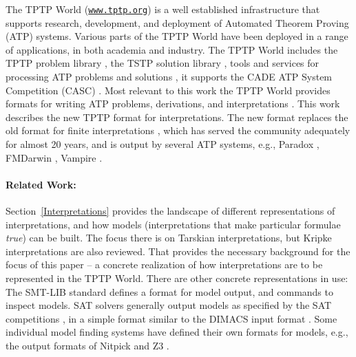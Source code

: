 \documentclass{easychair}
\begin{document}
The TPTP World \cite{Sut17} (\href{https://www.tptp.org}{\tt www.tptp.org}) is a well established 
infrastructure that supports research, development, and deployment of Automated Theorem Proving 
(ATP) systems.
Various parts of the TPTP World have been deployed in a range of applications,
in both academia and industry.
The TPTP World includes the TPTP problem library \cite{Sut09}, 
the TSTP solution library \cite{Sut10}, 
tools and services for processing ATP problems and solutions \cite{Sut10}, 
it supports the CADE ATP System Competition (CASC) \cite{Sut16}.
Most relevant to this work the TPTP World provides formats for writing ATP problems, 
derivations, and interpretations \cite{SS+06,Sut08-KEAPPA}.
This work describes the new TPTP format for interpretations.
The new format replaces the old format for finite interpretations \cite{SS+06}, which has 
served the community adequately for almost 20 years, and is output by several ATP systems, e.g., 
Paradox \cite{CS03}, FMDarwin \cite{BF+06}, Vampire \cite{KV13}.

\paragraph{Related Work:}
Section~\ref{Interpretations} provides the landscape of different representations of
interpretations, and how models (interpretations that make particular formulae {\em true})
can be built.
The focus there is on Tarskian interpretations, but Kripke interpretations are also reviewed.
That provides the necessary background for the focus of this paper -- a concrete realization
of how interpretations are to be represented in the TPTP World.
There are other concrete representations in use:
The SMT-LIB standard \cite{BFT17} defines a format for model output, and commands to inspect 
models.  
SAT solvers generally output models as specified by the SAT competitions \cite{JL+12}, in a 
simple format similar to the DIMACS input format \cite{Bab93}.
Some individual model finding systems have defined their own formats for models, e.g., the 
output formats of Nitpick and Z3 \cite{dMB08}.
\end{document}
